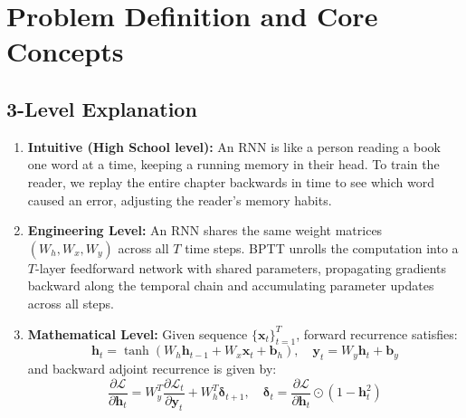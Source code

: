 \documentclass[11pt,a4paper]{article}
\theoremstyle{definition}
\begin{document}
\section{Problem Definition and Core Concepts}

\subsection{3-Level Explanation}
\begin{enumerate}
    \item \textbf{Intuitive (High School level):} An RNN is like a person reading a book one word at a time, keeping a running memory in their head. To train the reader, we replay the entire chapter backwards in time to see which word caused an error, adjusting the reader's memory habits.
    \item \textbf{Engineering Level:} An RNN shares the same weight matrices $(W_h, W_x, W_y)$ across all $T$ time steps. BPTT unrolls the computation into a $T$-layer feedforward network with shared parameters, propagating gradients backward along the temporal chain and accumulating parameter updates across all steps.
    \item \textbf{Mathematical Level:} Given sequence $\{\mathbf{x}_t\}_{t=1}^T$, forward recurrence satisfies:
    \begin{equation}
    \mathbf{h}_t = \tanh(W_h \mathbf{h}_{t-1} + W_x \mathbf{x}_t + \mathbf{b}_h), \quad \mathbf{y}_t = W_y \mathbf{h}_t + \mathbf{b}_y
    \end{equation}
    and backward adjoint recurrence is given by:
    \begin{equation}
    \frac{\partial \mathcal{L}}{\partial \mathbf{h}_t} = W_y^T \frac{\partial \mathcal{L}_t}{\partial \mathbf{y}_t} + W_h^T \boldsymbol{\delta}_{t+1}, \quad \boldsymbol{\delta}_t = \frac{\partial \mathcal{L}}{\partial \mathbf{h}_t} \odot (1 - \mathbf{h}_t^2)
    \end{equation}
\end{enumerate}
\end{document}
